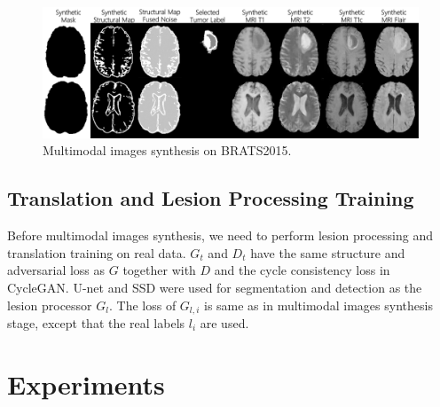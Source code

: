 \documentclass[runningheads]{llncs}
\begin{document}
	\begin{figure}[th]
		\centering
		\includegraphics[width=0.8\linewidth]{figures/F_to_MRI}
		\caption{Multimodal images synthesis on BRATS2015.}
		\label{generated_mri}
	\end{figure}
	\subsection{Translation and Lesion Processing Training}
	Before multimodal images synthesis, we need to perform lesion processing and translation training on real data. $G_t$ and $D_t$ have the same structure and adversarial loss as $G$ together with $D$ and the cycle consistency loss in CycleGAN\cite{6zhu2017unpaired}.
	U-net and SSD\cite{101liu2016ssd:} were used for segmentation and detection as the lesion processor $G_l$. The loss of $G_{l,i}$ is same as in multimodal images synthesis stage, except that the real labels $l_i$ are used.
	\section{Experiments}
\end{document}
